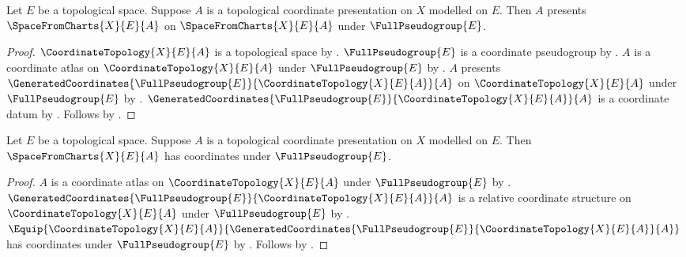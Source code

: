 \begin{theorem}\label{space_from_charts_presentation}
    Let $E$ be a topological space.
    Suppose $A$ is a topological coordinate presentation on $X$ modelled on $E$.
    Then $A$ presents $\SpaceFromCharts{X}{E}{A}$ on $\SpaceFromCharts{X}{E}{A}$
        under $\FullPseudogroup{E}$.
\end{theorem}
\begin{proof}
    $\CoordinateTopology{X}{E}{A}$ is a topological space by .
    $\FullPseudogroup{E}$ is a coordinate pseudogroup by .
    $A$ is a coordinate atlas on $\CoordinateTopology{X}{E}{A}$ under $\FullPseudogroup{E}$ by
        .
    $A$ presents $\GeneratedCoordinates{\FullPseudogroup{E}}{\CoordinateTopology{X}{E}{A}}{A}$
        on $\CoordinateTopology{X}{E}{A}$ under $\FullPseudogroup{E}$ by
        .
    $\GeneratedCoordinates{\FullPseudogroup{E}}{\CoordinateTopology{X}{E}{A}}{A}$ is a coordinate datum by
        .
    Follows by .
\end{proof}

\begin{theorem}\label{space_from_charts_coordinates}
    Let $E$ be a topological space.
    Suppose $A$ is a topological coordinate presentation on $X$ modelled on $E$.
    Then $\SpaceFromCharts{X}{E}{A}$ has coordinates under $\FullPseudogroup{E}$.
\end{theorem}
\begin{proof}
    $A$ is a coordinate atlas on $\CoordinateTopology{X}{E}{A}$ under
        $\FullPseudogroup{E}$ by .
    $\GeneratedCoordinates{\FullPseudogroup{E}}{\CoordinateTopology{X}{E}{A}}{A}$
        is a relative coordinate structure on $\CoordinateTopology{X}{E}{A}$
        under $\FullPseudogroup{E}$ by .
    $\Equip{\CoordinateTopology{X}{E}{A}}
        {\GeneratedCoordinates{\FullPseudogroup{E}}{\CoordinateTopology{X}{E}{A}}{A}}$
        has coordinates under $\FullPseudogroup{E}$ by .
    Follows by .
\end{proof}

